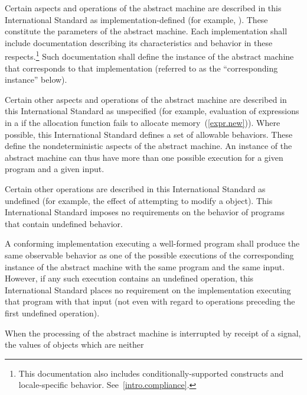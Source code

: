 %
\pnum
Certain aspects and operations of the abstract machine are described in this
International Standard as implementation-defined (for example,
). These constitute the parameters of the abstract machine.
Each implementation shall include documentation describing its characteristics
and behavior in these respects.\footnote{This documentation also includes
conditionally-supported constructs and locale-specific behavior.
See~\ref{intro.compliance}.} Such documentation shall define the instance of the
abstract machine that corresponds to that implementation (referred to as the
``corresponding instance'' below).

%
\pnum
Certain other aspects and operations of the abstract machine are
described in this International Standard as unspecified (for example,
evaluation of expressions in a  if the allocation
function fails to allocate memory~(\ref{expr.new})). Where possible, this
International Standard defines a set of allowable behaviors. These
define the nondeterministic aspects of the abstract machine. An instance
of the abstract machine can thus have more than one possible execution
for a given program and a given input.

%
\pnum
Certain other operations are described in this International Standard as
undefined (for example, the effect of
attempting to modify a  object).
\enternote This International Standard imposes no requirements on the
behavior of programs that contain undefined behavior. \exitnote

%
%
\pnum
A conforming implementation executing a well-formed program shall
produce the same observable behavior as one of the possible executions
of the corresponding instance of the abstract machine with the
same program and the same input. However, if any such execution contains an undefined operation, this International Standard places no
requirement on the implementation executing that program with that input
(not even with regard to operations preceding the first undefined
operation).

%
%
%
%
\pnum
When the processing of the abstract machine is interrupted by receipt of
a signal, the values of objects which are neither

